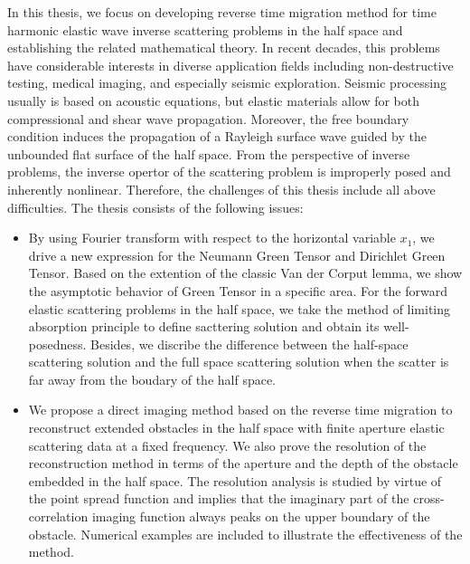 In this thesis, we focus on developing reverse time migration method for time harmonic elastic wave inverse scattering problems in the half space and establishing the related mathematical theory. In recent decades, this problems have considerable interests in diverse application fields including non-destructive testing, medical imaging, and especially seismic exploration.
Seismic processing
 usually is based on acoustic equations, but elastic materials allow for both compressional and shear wave propagation. Moreover, the free boundary condition induces the propagation of a Rayleigh surface wave guided by the unbounded flat surface of the half space. From the perspective of inverse problems, the inverse opertor of the scattering problem is improperly posed and inherently nonlinear. Therefore, the challenges of this thesis include all above difficulties. The thesis consists of the following issues:
\begin{itemize}
	\item By using Fourier transform with respect to the horizontal variable $x_1$, we drive a new expression for the Neumann Green Tensor and Dirichlet Green Tensor. Based on the extention of the classic Van der Corput lemma, we show the asymptotic behavior of Green Tensor in a specific area. For the forward elastic scattering problems in the half space, we take the method of limiting absorption principle to define  sacttering solution and obtain its well-posedness. Besides, we discribe the difference between the half-space scattering solution and the full space scattering solution  when the scatter is far away from the boudary of the half space.
	
	
	\item We propose a direct imaging method based on the reverse time migration to reconstruct extended
	obstacles in the half space with finite aperture elastic scattering data at a fixed
	frequency. We also prove the resolution of the reconstruction method in terms of the
	aperture and the depth of the obstacle embedded in the half space. The resolution
	analysis is studied by virtue of the point spread function and implies that the imaginary 
	part of the cross-correlation imaging function
	always peaks on the upper boundary of the obstacle. Numerical examples
	are included to illustrate the effectiveness of the method. 
\end{itemize}
	


